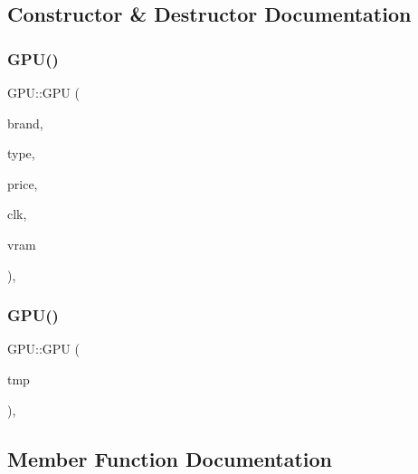 \subsection{Constructor \& Destructor Documentation}
\mbox{\label{class_g_p_u_a358f512b1583399e68f76248bb305e61}} 
\subsubsection{\texorpdfstring{GPU()}{GPU()}\hspace{0.1cm}{\footnotesize\ttfamily [1/2]}}
{\footnotesize\ttfamily G\+P\+U\+::\+G\+PU (\begin{DoxyParamCaption}\item[{\mbox{\hyperlink{class_string}{String}}}]{brand,  }\item[{\mbox{\hyperlink{class_string}{String}}}]{type,  }\item[{int}]{price,  }\item[{int}]{clk,  }\item[{int}]{vram }\end{DoxyParamCaption})\hspace{0.3cm}{\ttfamily [inline]}, {\ttfamily [explicit]}}

\mbox{\label{class_g_p_u_a9b1632e965c26051ae583c9b5e1c2e3c}} 
\subsubsection{\texorpdfstring{GPU()}{GPU()}\hspace{0.1cm}{\footnotesize\ttfamily [2/2]}}
{\footnotesize\ttfamily G\+P\+U\+::\+G\+PU (\begin{DoxyParamCaption}\item[{\mbox{\hyperlink{struct_temp_input}{Temp\+Input}} \&}]{tmp }\end{DoxyParamCaption})\hspace{0.3cm}{\ttfamily [inline]}, {\ttfamily [explicit]}}



\subsection{Member Function Documentation}
\mbox{\label{class_g_p_u_abfa2a8fa30047e9759080d724e4b3820}} 
